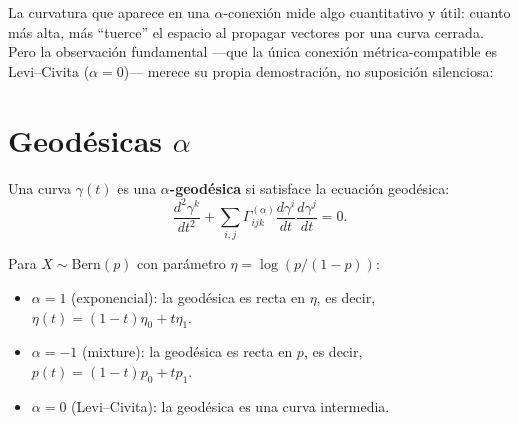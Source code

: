 \bigskip
\noindent
La curvatura que aparece en una $\alpha$-conexión mide algo cuantitativo y útil: cuanto más alta, más ``tuerce'' el espacio al propagar vectores por una curva cerrada. Pero la observación fundamental ---que la única conexión métrica-compatible es Levi--Civita ($\alpha = 0$)--- merece su propia demostración, no suposición silenciosa:

\section[Geodésicas $\alpha$]{Geodésicas $\alpha$}

\begin{definition}
	Una curva $\gamma(t)$ es una \textbf{$\alpha$-geodésica} si satisface la ecuación geodésica:
	\[
	\frac{d^2\gamma^k}{dt^2} + \sum_{i,j} \Gamma^{(\alpha)}_{ijk}\frac{d\gamma^i}{dt}\frac{d\gamma^j}{dt} = 0.
	\]
\end{definition}

\begin{example}
	Para $X \sim \mathrm{Bern}(p)$ con parámetro $\eta = \log(p/(1-p))$:
	\begin{itemize}
		\item $\alpha = 1$ (exponencial): la geodésica es recta en $\eta$, es decir, $\eta(t) = (1-t)\eta_0 + t\eta_1$.
		\item $\alpha = -1$ (mixture): la geodésica es recta en $p$, es decir, $p(t) = (1-t)p_0 + tp_1$.
		\item $\alpha = 0$ (Levi--Civita): la geodésica es una curva intermedia.
	\end{itemize}
\end{example}

\begin{center}
\end{center}

